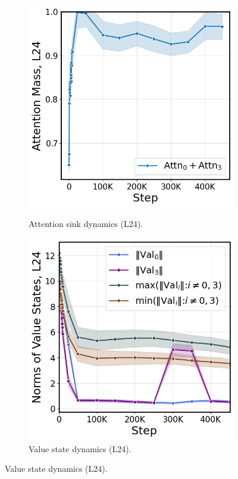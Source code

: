\begin{figure}[thp]
    \centering
    \begin{subfigure}[t]{0.32\textwidth}
        \centering 
        \caption{\small Attention sink dynamics (L24).}
        \includegraphics[width=\textwidth]{Figures/olmo/olmo_sink.png}
        \label{fig:olmo_sink}
    \end{subfigure}
    \begin{subfigure}[t]{0.32\textwidth}
        \centering 
        \caption{\small Value state dynamics (L24).}
        \includegraphics[width=\textwidth]{Figures/olmo/olmo_value_states.png}

\end{subfigure}
\end{figure}
